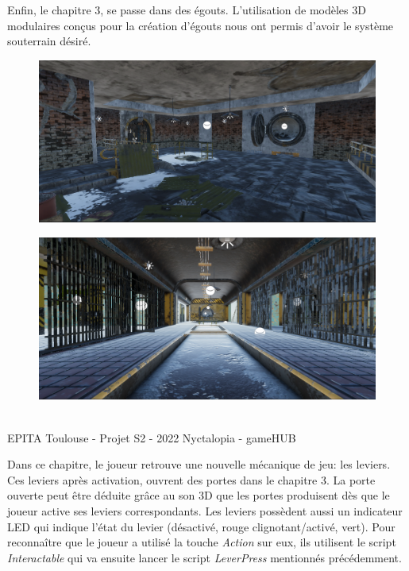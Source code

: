 Enfin, le chapitre 3, se passe dans des égouts. L'utilisation de modèles 3D modulaires conçus pour la création d'égouts nous ont permis d'avoir le système souterrain désiré. 
\newline


\begin{figure}[H]
\centering
\begin{minipage}{.5\textwidth}
  \centering
  \includegraphics[width=.8\linewidth]{img/egouts/1.PNG}
  \label{fig:chap3}
\end{minipage}%
\begin{minipage}{.5\textwidth}
  \centering
  \includegraphics[width=.8\linewidth]{img/egouts/3.png}
  \label{fig:chap3bis}
\end{minipage}
\end{figure}

\vfill
\noindent\makebox[\linewidth]{\rule{.8\paperwidth}{.6pt}}\\[0.2cm]
EPITA Toulouse - Projet S2 - 2022 \hfill Nyctalopia - gameHUB
\noindent\makebox[\linewidth]{\rule{.8\paperwidth}{.6pt}}
\newpage

Dans ce chapitre, le joueur retrouve une nouvelle mécanique de jeu: les leviers. Ces leviers après activation, ouvrent des portes dans le chapitre 3. La porte ouverte peut être déduite grâce au son 3D que les portes produisent dès que le joueur active ses leviers correspondants. Les leviers possèdent aussi un indicateur LED qui indique l'état du levier (désactivé, rouge clignotant/activé, vert).
Pour reconnaître que le joueur a utilisé la touche \emph{Action} sur eux, ils utilisent le script \emph{Interactable} qui va ensuite lancer le script \emph{LeverPress} mentionnés précédemment.
\newline

